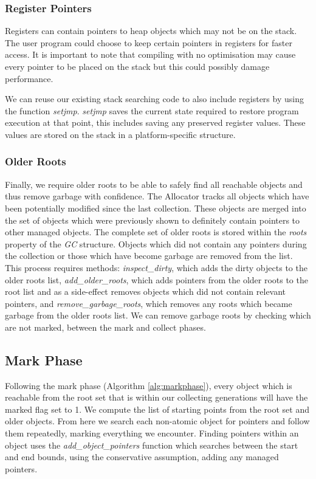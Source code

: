 \documentclass[../diss.tex]{subfiles}
\begin{document}
\subsubsection{Register Pointers}
Registers can contain pointers to heap objects which may not be on the stack. The user program could choose to keep certain pointers in registers for faster access. It is important to note that compiling with no optimisation may cause every pointer to be placed on the stack but this could possibly damage performance. 

We can reuse our existing stack searching code to also include registers by using the function \emph{setjmp}. \emph{setjmp} saves the current state required to restore program execution at that point, this includes saving any preserved register values. These values are stored on the stack in a platform-specific structure.

\subsubsection{Older Roots}

Finally, we require older roots to be able to safely find all reachable objects and thus remove garbage with confidence. The Allocator tracks all objects which have been potentially modified since the last collection. These objects are merged into the set of objects which were previously shown to definitely contain pointers to other managed objects. The complete set of older roots is stored within the \emph{roots} property of the \emph{GC} structure. Objects which did not contain any pointers during the collection or those which have become garbage are removed from the list. This process requires methods: \emph{inspect\_dirty}, which adds the dirty objects to the older roots list, \emph{add\_older\_roots}, which adds pointers from the older roots to the root list and as a side-effect removes objects which did not contain relevant pointers, and \emph{remove\_garbage\_roots}, which removes any roots which became garbage from the older roots list. We can remove garbage roots by checking which are not marked, between the mark and collect phases.

\subsection{Mark Phase}
\label{sec:markphase}

Following the mark phase (Algorithm \ref{alg:markphase}), every object which is reachable from the root set that is within our collecting generations will have the marked flag set to 1. We compute the list of starting points from the root set and older objects. From here we search each non-atomic object for pointers and follow them repeatedly, marking everything we encounter. Finding pointers within an object uses the \emph{add\_object\_pointers} function which searches between the start and end bounds, using the conservative assumption, adding any managed pointers.
\end{document}
